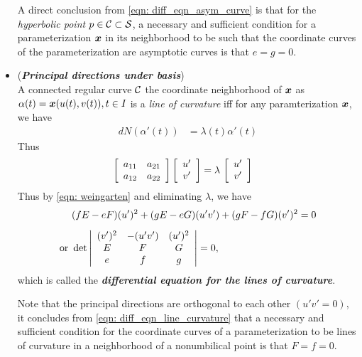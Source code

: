 \documentclass[11pt]{article}
\begin{document}
\begin{itemize}
A direct conclusion from \eqref{eqn: diff_eqn_asym_curve} is that for the \emph{hyperbolic point} $p\in {\mathcal C}\subset {\mathcal S}$, a necessary and sufficient condition for a parameterization $\boldsymbol{x}$ in its neighborhood to be such that the coordinate curves of the parameterization are asymptotic curves is that $e= g= 0$.

\item (\emph{\textbf{Principal directions under basis}})\\
A connected regular curve ${\mathcal C}$ the coordinate neighborhood of $\boldsymbol{x}$ as $\alpha(t) = \boldsymbol{x}(u(t), v(t)), t\in I$ is a \emph{line of curvature} iff for any paramterization $\boldsymbol{x}$, we have 
\begin{align*}
dN(\alpha'(t)) &= \lambda(t)\alpha'(t)
\end{align*}
Thus
\begin{align*}
\left[\begin{array}{cc}
a_{11} & a_{21} \\ 
a_{12} & a_{22}
\end{array} \right]\left[\begin{array}{c}
u' \\ 
v'
\end{array} \right] &= \lambda\,\left[\begin{array}{c}
u' \\ 
v'
\end{array} \right]
\end{align*}
Thus by \eqref{eqn: weingarten} and eliminating $\lambda$, we have
\begin{align}
&(fE- eF)(u')^{2} + (gE-eG)(u'v')+ (gF-fG)(v')^{2} = 0\nonumber\\[5pt]
\text{or }& 
\det\left\lvert \begin{array}{ccc}
(v')^{2} & -(u'v') & (u')^{2}  \\ 
E & F & G \\ 
e & f & g
\end{array}  \right\rvert = 0, \label{eqn: diff_eqn_line_curvature}
\end{align} which is called the \emph{\textbf{differential equation for the lines of curvature}}.

Note that the principal directions are orthogonal to each other $(u'v' =0)$, it concludes from \eqref{eqn: diff_eqn_line_curvature} that a necessary and sufficient condition for the coordinate curves of a parameterization to be lines of curvature in a neighborhood of a nonumbilical point is that $F=f = 0$. 
\end{itemize}
\end{document}
